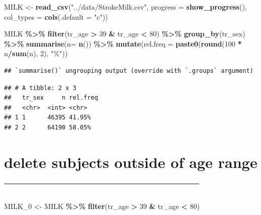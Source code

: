 \documentclass[
]{article}
\newenvironment{Shaded}{\begin{snugshade}}{\end{snugshade}}
\newcommand{\DataTypeTok}[1]{\textcolor[rgb]{0.13,0.29,0.53}{#1}}
\newcommand{\DecValTok}[1]{\textcolor[rgb]{0.00,0.00,0.81}{#1}}
\newcommand{\KeywordTok}[1]{\textcolor[rgb]{0.13,0.29,0.53}{\textbf{#1}}}
\newcommand{\NormalTok}[1]{#1}
\newcommand{\OperatorTok}[1]{\textcolor[rgb]{0.81,0.36,0.00}{\textbf{#1}}}
\newcommand{\StringTok}[1]{\textcolor[rgb]{0.31,0.60,0.02}{#1}}
\begin{document}
\begin{Shaded}
\begin{Highlighting}[]
\NormalTok{MILK \textless{}{-}}\StringTok{ }\KeywordTok{read\_csv}\NormalTok{(}\StringTok{"../data/StrokeMilk.csv"}\NormalTok{, }
                     \DataTypeTok{progress =} \KeywordTok{show\_progress}\NormalTok{(), }
                     \DataTypeTok{col\_types =} \KeywordTok{cols}\NormalTok{(}\DataTypeTok{.default =} \StringTok{"c"}\NormalTok{))}

\NormalTok{MILK }\OperatorTok{\%\textgreater{}\%}\StringTok{ }
\StringTok{  }\KeywordTok{filter}\NormalTok{(tr\_age }\OperatorTok{\textgreater{}}\StringTok{ }\DecValTok{39} \OperatorTok{\&}\StringTok{ }\NormalTok{tr\_age }\OperatorTok{\textless{}}\StringTok{ }\DecValTok{80}\NormalTok{) }\OperatorTok{\%\textgreater{}\%}\StringTok{ }
\StringTok{  }\KeywordTok{group\_by}\NormalTok{(tr\_sex) }\OperatorTok{\%\textgreater{}\%}\StringTok{ }
\StringTok{  }\KeywordTok{summarise}\NormalTok{(}\DataTypeTok{n=} \KeywordTok{n}\NormalTok{()) }\OperatorTok{\%\textgreater{}\%}
\StringTok{  }\KeywordTok{mutate}\NormalTok{(}\DataTypeTok{rel.freq =} \KeywordTok{paste0}\NormalTok{(}\KeywordTok{round}\NormalTok{(}\DecValTok{100} \OperatorTok{*}\StringTok{ }\NormalTok{n}\OperatorTok{/}\KeywordTok{sum}\NormalTok{(n), }\DecValTok{2}\NormalTok{), }\StringTok{"\%"}\NormalTok{))  }
\end{Highlighting}
\end{Shaded}

\begin{verbatim}
## `summarise()` ungrouping output (override with `.groups` argument)
\end{verbatim}

\begin{verbatim}
## # A tibble: 2 x 3
##   tr_sex     n rel.freq
##   <chr>  <int> <chr>   
## 1 1      46395 41.95%  
## 2 2      64190 58.05%
\end{verbatim}

\hypertarget{delete-subjects-outside-of-age-range}{%
\section{delete subjects outside of age range
------------------------------------}\label{delete-subjects-outside-of-age-range}}

\begin{Shaded}
\begin{Highlighting}[]
\NormalTok{MILK\_}\DecValTok{0}\NormalTok{ \textless{}{-}}\StringTok{ }\NormalTok{MILK }\OperatorTok{\%\textgreater{}\%}
\StringTok{  }\KeywordTok{filter}\NormalTok{(tr\_age }\OperatorTok{\textgreater{}}\StringTok{ }\DecValTok{39} \OperatorTok{\&}\StringTok{ }\NormalTok{tr\_age }\OperatorTok{\textless{}}\StringTok{ }\DecValTok{80}\NormalTok{)}
\end{Highlighting}
\end{Shaded}
\end{document}
